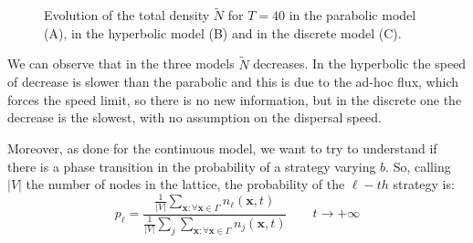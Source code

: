 \begin{figure}

 \caption{\label{fig:N_tot} Evolution of the total density $\tilde{N}$ for
$T=40$ in the parabolic model (A), in the hyperbolic model (B) and
in the discrete model (C).}

\end{figure}

We can observe that in the three models $\tilde{N}$ decreases. In
the hyperbolic the speed of decrease is slower than the parabolic
and this is due to the ad-hoc flux, which forces the speed limit,
so there is no new information, but in the discrete one the decrease
is the slowest, with no assumption on the dispersal speed.

Moreover, as done for the continuous model, we want to try to understand
if there is a phase transition in the probability of a strategy varying
$b$. So, calling $\left|V\right|$ the number of nodes in the lattice,
the probability of the $\ell-th$ strategy is:
\[
p_{\ell}=\frac{\frac{1}{\left|V\right|}\sum_{\mathbf{x}:\forall\mathbf{x}\in\Gamma}n_{\ell}(\mathbf{x},t)}{\frac{1}{\left|V\right|}\sum_{j}\sum_{\mathbf{x}:\forall\mathbf{x}\in\Gamma}n_{j}(\mathbf{x},t)}\qquad t\rightarrow+\infty
\]

